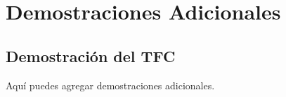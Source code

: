 \chapter{Demostraciones Adicionales}

\section{Demostración del TFC}
Aquí puedes agregar demostraciones adicionales.

